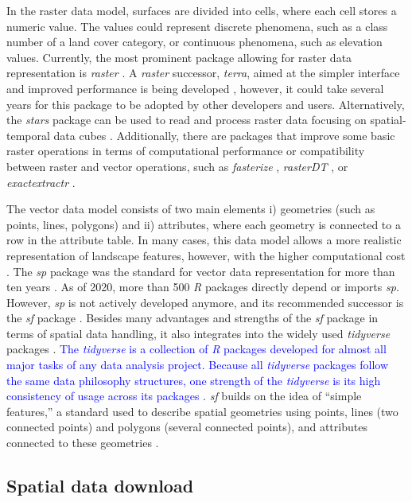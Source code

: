 \documentclass[smallextended]{svjour3}       %
\begin{document}
In the raster data model, surfaces are divided into cells, where each cell stores a numeric value.
The values could represent discrete phenomena, such as a class number of a land cover category, or continuous phenomena, such as elevation values.
Currently, the most prominent package allowing for raster data representation is \textit{raster} \cite{Hijmans2019}.
A \textit{raster} successor, \textit{terra}, aimed at the simpler interface and improved performance is being developed \cite{Hijmans2021}, however, it could take several years for this package to be adopted by other developers and users.
Alternatively, the \textit{stars} package can be used to read and process raster data focusing on spatial-temporal data cubes \cite{Pebesma2019}.
Additionally, there are packages that improve some basic raster operations in terms of computational performance or compatibility between raster and vector operations, such as \textit{fasterize} \cite{Ross2020}, \textit{rasterDT} \cite{OBrien2020}, or \textit{exactextractr} \cite{Baston2020}.

The vector data model consists of two main elements i) geometries (such as points, lines, polygons) and ii) attributes, where each geometry is connected to a row in the attribute table.
In many cases, this data model allows a more realistic representation of landscape features, however, with the higher computational cost \cite{Lovelace2019}.
The \textit{sp} package was the standard for vector data representation for more than ten years \cite{Pebesma2005,Bivand2013}.
As of 2020, more than 500 \textit{R} packages directly depend or imports \textit{sp}.
However, \textit{sp} is not actively developed anymore, and its recommended successor is the \textit{sf} package \cite{Pebesma2018}.
Besides many advantages and strengths of the \textit{sf} package in terms of spatial data handling, it also integrates into the widely used \textit{tidyverse} packages \cite{Wickham2019}.
\textcolor{blue}{The \textit{tidyverse} is a collection of \textit{R} packages developed for almost all major tasks of any data analysis project. 
Because all \textit{tidyverse} packages follow the same data philosophy structures, one strength of the \textit{tidyverse} is its high consistency of usage across its packages \cite{Wickham2019}.}
\textit{sf} builds on the idea of ``simple features,'' a standard used to describe spatial geometries using points, lines (two connected points) and polygons (several connected points), and attributes connected to these geometries \cite{Pebesma2019a}.

\hypertarget{spatial-data-download}{%
\subsection{Spatial data download}\label{spatial-data-download}}
\end{document}
